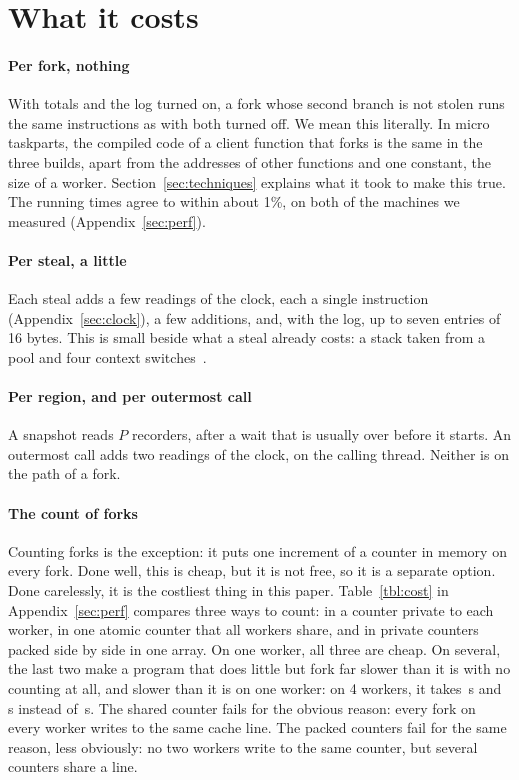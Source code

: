 \documentclass[sigplan,nonacm]{acmart}
\newcommand{\perftime}[2]{\fbval{times}{#1}{P = #2}}
\begin{document}
\section{What it costs}
\label{sec:cost}

\paragraph{Per fork, nothing}
%
With totals and the log turned on, a fork whose second branch is not
stolen runs the same instructions as with both turned off.
%
We mean this literally.
%
In micro taskparts, the compiled code of a client function that forks
is the same in the three builds, apart from the addresses of other
functions and one constant, the size of a worker.
%
Section~\ref{sec:techniques} explains what it took to make this true.
%
The running times agree to within about 1\%, on both of the machines
we measured (Appendix~\ref{sec:perf}).

\paragraph{Per steal, a little}
%
Each steal adds a few readings of the clock, each a single
instruction (Appendix~\ref{sec:clock}), a few additions, and, with the
log, up to seven entries of 16 bytes.
%
This is small beside what a steal already costs: a stack taken from a
pool and four context switches~\cite{nativeforkjoin}.

\paragraph{Per region, and per outermost call}
%
A snapshot reads $P$ recorders, after a wait that is usually over
before it starts.
%
An outermost call adds two readings of the clock, on the calling
thread.
%
Neither is on the path of a fork.

\paragraph{The count of forks}
%
Counting forks is the exception: it puts one increment of a counter in
memory on every fork.
%
Done well, this is cheap, but it is not free, so it is a separate
option.
%
Done carelessly, it is the costliest thing in this paper.
%
Table~\ref{tbl:cost} in Appendix~\ref{sec:perf} compares three ways to
count: in a counter private to each worker, in one atomic counter that
all workers share, and in private counters packed side by side in one
array.
%
On one worker, all three are cheap.
%
On several, the last two make a program that does little but fork
far slower than it is with no counting at all, and slower than it is
on one worker: on 4 workers, it takes \perftime{atomic}{4}\,s and
\perftime{packed}{4}\,s instead of \perftime{plain}{4}\,s.
%
The shared counter fails for the obvious reason: every fork on every
worker writes to the same cache line.
%
The packed counters fail for the same reason, less obviously: no two
workers write to the same counter, but several counters share a line.
\end{document}
